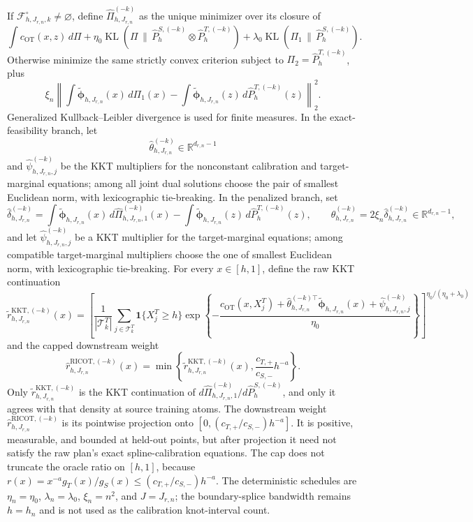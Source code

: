 If \(\mathcal F^\circ_{h,J_{r,n},k}\ne\varnothing\), define \(\widehat\Pi^{(-k)}_{h,J_{r,n}}\) as the unique minimizer over its closure of
\[
\int c_{\mathrm{OT}}(x,z)\,d\Pi
+\eta_0\operatorname{KL}(\Pi\,\|\,\widehat P^{S,(-k)}_h\otimes\widehat P^{T,(-k)}_h)
+\lambda_0\operatorname{KL}(\Pi_1\,\|\,\widehat P^{S,(-k)}_h).
\]
Otherwise minimize the same strictly convex criterion subject to \(\Pi_2=\widehat P^{T,(-k)}_h\), plus
\[
\xi_n\left\|
\int\widetilde{\boldsymbol\phi}_{h,J_{r,n}}(x)\,d\Pi_1(x)
-\int\widetilde{\boldsymbol\phi}_{h,J_{r,n}}(z)\,d\widehat P^{T,(-k)}_h(z)
\right\|_2^2.
\]
Generalized Kullback--Leibler divergence is used for finite measures. In the exact-feasibility branch, let
\[
\widehat\theta^{(-k)}_{h,J_{r,n}}\in\mathbb R^{d_{r,n}-1}
\]
and \(\widehat\psi^{(-k)}_{h,J_{r,n},j}\) be the KKT multipliers for the nonconstant calibration and target-marginal equations; among all joint dual solutions choose the pair of smallest Euclidean norm, with lexicographic tie-breaking. In the penalized branch, set
\[
\widehat\delta^{(-k)}_{h,J_{r,n}}=
\int\widetilde{\boldsymbol\phi}_{h,J_{r,n}}(x)\,d\widehat\Pi^{(-k)}_{h,J_{r,n},1}(x)
-\int\widetilde{\boldsymbol\phi}_{h,J_{r,n}}(z)\,d\widehat P^{T,(-k)}_h(z),
\qquad
\widehat\theta^{(-k)}_{h,J_{r,n}}=2\xi_n\widehat\delta^{(-k)}_{h,J_{r,n}}
\in\mathbb R^{d_{r,n}-1},
\]
and let \(\widehat\psi^{(-k)}_{h,J_{r,n},j}\) be a KKT multiplier for the target-marginal equations; among compatible target-marginal multipliers choose the one of smallest Euclidean norm, with lexicographic tie-breaking. For every \(x\in[h,1]\), define the raw KKT continuation
\[
\widetilde r^{\mathrm{KKT},(-k)}_{h,J_{r,n}}(x)=
\left[
\frac1{|\mathcal T^T_k|}\sum_{j\in\mathcal T^T_k}\mathbf 1\{X_j^T\ge h\}
\exp\left\{-\frac{c_{\mathrm{OT}}(x,X_j^T)
+\widehat\theta_{h,J_{r,n}}^{(-k)\top}\widetilde{\boldsymbol\phi}_{h,J_{r,n}}(x)
+\widehat\psi^{(-k)}_{h,J_{r,n},j}}{\eta_0}\right\}
\right]^{\eta_0/(\eta_0+\lambda_0)}
\]
and the capped downstream weight
\[
\widehat r^{\mathrm{RICOT},(-k)}_{h,J_{r,n}}(x)
=\min\left\{\widetilde r^{\mathrm{KKT},(-k)}_{h,J_{r,n}}(x),\frac{c_{T,+}}{c_{S,-}}h^{-a}\right\}.
\]
Only \(\widetilde r^{\mathrm{KKT},(-k)}_{h,J_{r,n}}\) is the KKT continuation of \(d\widehat\Pi^{(-k)}_{h,J_{r,n},1}/d\widehat P^{S,(-k)}_h\), and only it agrees with that density at source training atoms. The downstream weight \(\widehat r^{\mathrm{RICOT},(-k)}_{h,J_{r,n}}\) is its pointwise projection onto \([0,(c_{T,+}/c_{S,-})h^{-a}]\). It is positive, measurable, and bounded at held-out points, but after projection it need not satisfy the raw plan's exact spline-calibration equations. The cap does not truncate the oracle ratio on \([h,1]\), because \(r(x)=x^{-a}g_T(x)/g_S(x)\le(c_{T,+}/c_{S,-})h^{-a}\). The deterministic schedules are \(\eta_n=\eta_0\), \(\lambda_n=\lambda_0\), \(\xi_n=n^2\), and \(J=J_{r,n}\); the boundary-splice bandwidth remains \(h=h_n\) and is not used as the calibration knot-interval count.

